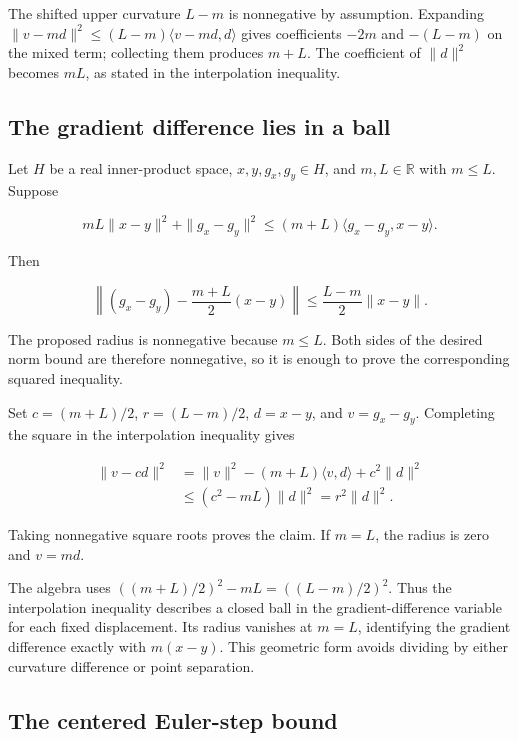 \documentclass[11pt,a4paper]{report}
\begin{document}
The shifted upper curvature \(L-m\) is nonnegative by assumption. Expanding \(\|v-md\|^2\le(L-m)\langle v-md,d\rangle\) gives coefficients \(-2m\) and \(-(L-m)\) on the mixed term; collecting them produces \(m+L\). The coefficient of \(\|d\|^2\) becomes \(mL\), as stated in the interpolation inequality.

\subsection{\texorpdfstring{The gradient difference lies in a ball}{The gradient difference lies in a ball}}
\label{report-step-UnadjustedLangevin-SharpContraction-lean-3}


Let \(H\) be a real inner-product space, \(x,y,g_x,g_y\in H\), and \(m,L\in\mathbb R\) with \(m\le L\). Suppose

\[mL\|x-y\|^2+\|g_x-g_y\|^2\le(m+L)\langle g_x-g_y,x-y\rangle.\]

Then

\[\left\|(g_x-g_y)-\frac{m+L}{2}(x-y)\right\|\le\frac{L-m}{2}\|x-y\|.\]

The proposed radius is nonnegative because \(m\le L\). Both sides of the desired norm bound are therefore nonnegative, so it is enough to prove the corresponding squared inequality.



Set \(c=(m+L)/2\), \(r=(L-m)/2\), \(d=x-y\), and \(v=g_x-g_y\). Completing the square in the interpolation inequality gives

\[\begin{aligned}\|v-cd\|^2&=\|v\|^2-(m+L)\langle v,d\rangle+c^2\|d\|^2\\&\le(c^2-mL)\|d\|^2=r^2\|d\|^2.\end{aligned}\]

Taking nonnegative square roots proves the claim. If \(m=L\), the radius is zero and \(v=md\).



The algebra uses \(((m+L)/2)^2-mL=((L-m)/2)^2\). Thus the interpolation inequality describes a closed ball in the gradient-difference variable for each fixed displacement. Its radius vanishes at \(m=L\), identifying the gradient difference exactly with \(m(x-y)\). This geometric form avoids dividing by either curvature difference or point separation.

\subsection{\texorpdfstring{The centered Euler-step bound}{The centered Euler-step bound}}
\label{report-step-UnadjustedLangevin-SharpContraction-lean-4}
\end{document}
